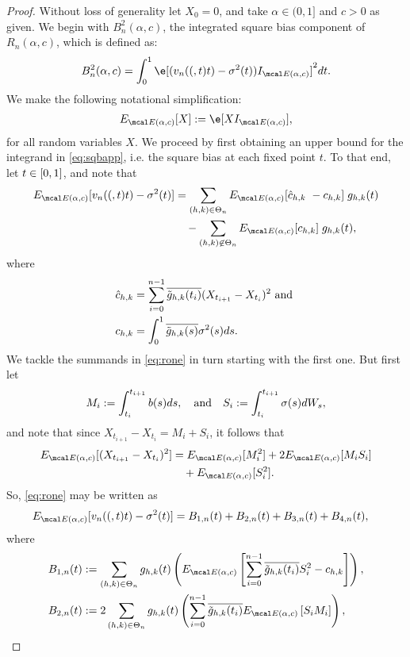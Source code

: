 \begin{appendices}
\begin{proof}
Without loss of generality let $X_0 = 0$, and  take $\alpha  \in (0, 1]$ and $c > 0$ as given. We begin with $B^2_n(\alpha, c)$, the integrated square bias component of $R_n(\alpha,c)$, which is defined as:
\begin{align}
  B^2_n(\alpha, c) = \int_0^1 \e[ (\svn(t) - \sigma^2(t))\indvol]^2 \D t. \label{eq:sqbapp}
\end{align}
We make the following notational simplification:
\begin{align}
  \eind [ X] := \e[ X \indvol], \notag
  \label{}
\end{align}
for all random variables $X$. We proceed by first obtaining an  upper bound  for the integrand in \eqref{eq:sqbapp}, i.e. the square bias at each fixed point $t$. To that end, let $t \in [0,1]$, and note that 
\begin{align}
  \eind[ \svn(t) - \sigma^2(t)] & = \sum_{(h,k) \in \Theta_n} \eind[\cnhk\ - \chk]\;g_{h,k}(t)\notag\\
  & \quad -\sum_{(h,k) \not\in \Theta_n} \eind[\chk]\;g_{h,k}(t),\label{eq:rone} 
\end{align}
  where 
\begin{align}  
  \hat{c}_{h,k} &= \sum_{i =0}^{n-1} \overline{\tilde{g}_{h,k}(t_i)} (X_{t_{i+1}} - X_{t_i})^2 \text{ and }\notag\\  
  {c}_{h,k} &= \int^1_0 \overline{\tilde{g}_{h,k}(s)} \sigma^2(s) d s. \notag
\end{align}
We tackle the summands in \eqref{eq:rone} in turn starting with the first one. But first let 
\begin{align}
  M_i := \int_{t_i}^{t_{i+1}} b(s) d s, \quad \text{and} \quad  S_i := \int_{t_i}^{t_{i+1}} \sigma(s) d W_s, \notag
\end{align}
and note that since $X_{t_{i+1}} - X_{t_i} = M_i + S_i$, it follows that
\begin{align}
  \eind[(X_{t_{i+1}} - X_{t_i})^2] &= \eind[M_i^2]  
  + 2\eind[M_iS_i] \notag\\ & \quad+ \eind[S_i^2].\notag 
\end{align}
So, \eqref{eq:rone} may be written as 
\begin{align}
  &\eind[\svn(t) - \sv(t)] = B_{1,n}(t) + B_{2,n}(t) + B_{3,n}(t) + B_{4,n}(t), \notag
\end{align}
where
\begin{align}
  &B_{1,n}(t) :=  \sumt g_{h,k}(t) \left(\eind\left[ \sum_{i=0}^{n-1} \btghki S_i^2  - \chk\right]\right), \notag\\
  &B_{2,n}(t) := 2 \sumt g_{h,k}(t)\left(\sum_{i=0}^{n-1} \btghki \eind\left[S_i M_i\right] \right), \notag\\

\end{align}
\end{proof}
\end{appendices}
